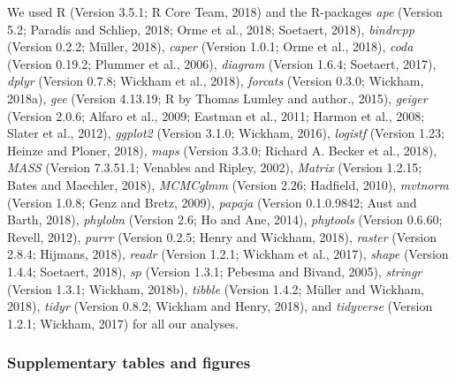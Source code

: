 \documentclass[man,floatsintext]{apa6}
\theoremstyle{definition}
\theoremstyle{definition}
\theoremstyle{definition}
\theoremstyle{remark}
\begin{document}
We used R (Version 3.5.1; R Core Team, 2018) and the R-packages
\emph{ape} (Version 5.2; Paradis and Schliep, 2018; Orme et al., 2018;
Soetaert, 2018), \emph{bindrcpp} (Version 0.2.2; Müller, 2018),
\emph{caper} (Version 1.0.1; Orme et al., 2018), \emph{coda} (Version
0.19.2; Plummer et al., 2006), \emph{diagram} (Version 1.6.4; Soetaert,
2017), \emph{dplyr} (Version 0.7.8; Wickham et al., 2018),
\emph{forcats} (Version 0.3.0; Wickham, 2018a), \emph{gee} (Version
4.13.19; R by Thomas Lumley and author., 2015), \emph{geiger} (Version
2.0.6; Alfaro et al., 2009; Eastman et al., 2011; Harmon et al., 2008;
Slater et al., 2012), \emph{ggplot2} (Version 3.1.0; Wickham, 2016),
\emph{logistf} (Version 1.23; Heinze and Ploner, 2018), \emph{maps}
(Version 3.3.0; Richard A. Becker et al., 2018), \emph{MASS} (Version
7.3.51.1; Venables and Ripley, 2002), \emph{Matrix} (Version 1.2.15;
Bates and Maechler, 2018), \emph{MCMCglmm} (Version 2.26; Hadfield,
2010), \emph{mvtnorm} (Version 1.0.8; Genz and Bretz, 2009),
\emph{papaja} (Version 0.1.0.9842; Aust and Barth, 2018), \emph{phylolm}
(Version 2.6; Ho and Ane, 2014), \emph{phytools} (Version 0.6.60;
Revell, 2012), \emph{purrr} (Version 0.2.5; Henry and Wickham, 2018),
\emph{raster} (Version 2.8.4; Hijmans, 2018), \emph{readr} (Version
1.2.1; Wickham et al., 2017), \emph{shape} (Version 1.4.4; Soetaert,
2018), \emph{sp} (Version 1.3.1; Pebesma and Bivand, 2005),
\emph{stringr} (Version 1.3.1; Wickham, 2018b), \emph{tibble} (Version
1.4.2; Müller and Wickham, 2018), \emph{tidyr} (Version 0.8.2; Wickham
and Henry, 2018), and \emph{tidyverse} (Version 1.2.1; Wickham, 2017)
for all our analyses. \newpage

\hypertarget{supplementary-tables-and-figures}{%
\subsubsection{Supplementary tables and
figures}\label{supplementary-tables-and-figures}}
\end{document}
